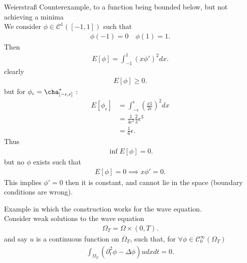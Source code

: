 \begin{example}
  Weierstraß Counterexample, to a function being bounded below, but not achieving a minima \\[1ex]
  We consider $\phi  \in  \mathcal{C}^{1}([-1,1])  $ such that
  \begin{align*}
    \phi(-1) = 0 \quad \phi(1) = 1
  .\end{align*}
  Then 
  \begin{align*}
    E[\phi ] = \int_{-1}^{1} (x \phi')^2 dx 
  .\end{align*}
  clearly 
  \begin{align*}
    E[\phi ] \ge 0
  .\end{align*}
  but for $\phi_{\epsilon} = \cha_{[-\epsilon,\epsilon]}^{*} $ : 
  \begin{align*}
    E[\phi_\epsilon] &= \int_{-\epsilon}^{\epsilon}  (\frac{x{1}}{2\epsilon})^2 dx \\
                     &= \frac{1}{4\epsilon ^2} \frac{2}{3} \epsilon ^{3} \\
                     &= \frac{1}{6} \epsilon
  .\end{align*}
  Thus 
  \begin{align*}
    \inf E[\phi ]  = 0
  .\end{align*}
  but no $\phi $ exists such that 
  \begin{align*}
    E[\phi ] = 0   \implies x\phi' = 0
  .\end{align*}
  This implies $\phi'  = 0$ then it is constant, and cannot lie in the space (boundary conditions are wrong).
\end{example}
\begin{example}
  Example in which the construction works for the wave equation. \\[1ex]
  Consider weak solutions to the wave equation 
  \begin{align*}
    \Omega_T = \Omega  \times  (0,T)
  .\end{align*}
  and say $u$ is a continuous function on $\overline{\Omega }_T$, such that, for $\forall  \phi  \in  \mathcal{C}_0^{\infty}(\Omega_T) $
  \begin{align*}
    \int_{\Omega_T} (\partial_t^2 \phi - \Delta  \phi )  u dx dt = 0
  .\end{align*}
\end{example}
